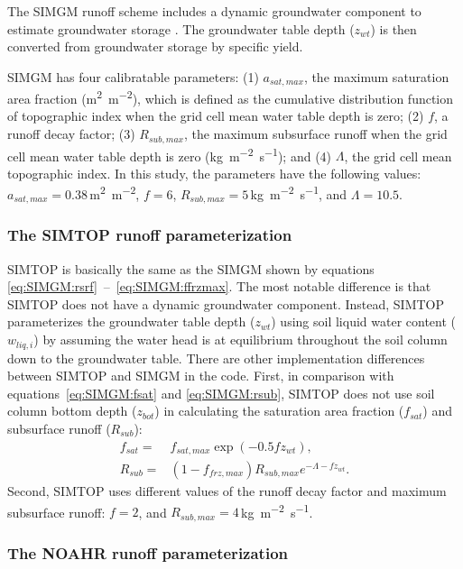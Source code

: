 \documentclass[essd]{copernicus}
\begin{document}
The SIMGM runoff scheme includes a dynamic groundwater component to estimate
groundwater storage \citep{niu2007JGRA}. The groundwater table depth (\(z_{wt}\))
is then converted from groundwater storage by specific yield.

SIMGM has four calibratable parameters: (1) \(a_{sat,max}\), the maximum
saturation area fraction (\si{m^2~m^{-2}}), which is defined as the cumulative
distribution function of topographic index when the grid cell mean water table
depth is zero; (2) \(f\), a runoff decay factor; (3) \(R_{sub,max}\), the
maximum subsurface runoff when the grid cell mean water table depth is zero
(\si{kg~m^{-2}~s^{-1}}); and (4) \(\Lambda\), the grid cell mean topographic
index. In this study, the parameters have the following values: \(a_{sat,max} =
0.38\)\,\si{m^2~m^{-2}}, $f=6$, $R_{sub,max}=5$\,\si{kg~m^{-2}~s^{-1}}, and
\(\Lambda = 10.5\).

\subsubsection{The SIMTOP runoff parameterization}

SIMTOP is basically the same as the SIMGM shown by equations
\eqref{eq:SIMGM:rsrf}~--~\eqref{eq:SIMGM:ffrzmax}. The most notable difference
is that SIMTOP does not have a dynamic groundwater component. Instead, SIMTOP
parameterizes the groundwater table depth (\(z_{wt}\)) using soil liquid water
content (\(w_{liq,i}\)) by assuming the water head is at equilibrium throughout
the soil column down to the groundwater table. There are other implementation
differences between SIMTOP and SIMGM in the code. First, in comparison with
equations~\eqref{eq:SIMGM:fsat} and \eqref{eq:SIMGM:rsub}, SIMTOP does not use
soil column bottom depth (\(z_{bot}\)) in calculating the saturation area
fraction (\(f_{sat}\)) and subsurface runoff (\(R_{sub}\)):
\begin{align}
  f_{sat} = & f_{sat,max} \exp(-0.5 f z_{wt}) \text{,} \\
  R_{sub} = & (1-f_{frz,max}) R_{sub,max} e^{-\Lambda-f z_{wt}} \text{.}
\end{align}
Second, SIMTOP uses different values of the runoff decay factor and maximum
subsurface runoff: \(f=2\), and \(R_{sub,max}=4\)\,\si{kg~m^{-2}~s^{-1}}.


\subsubsection{The NOAHR runoff parameterization}
\end{document}
